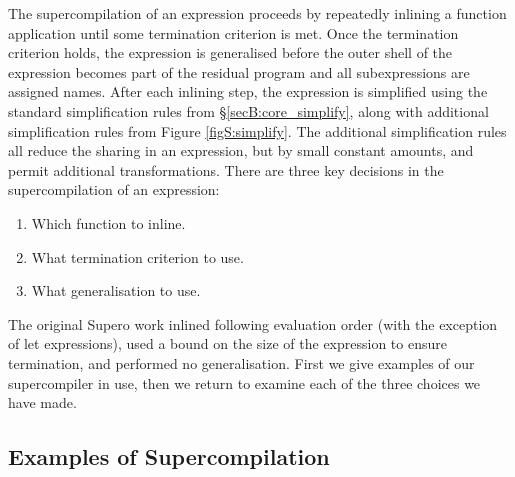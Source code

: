 The supercompilation of an expression proceeds by repeatedly inlining a function application until some termination criterion is met. Once the termination criterion holds, the expression is generalised before the outer shell of the expression becomes part of the residual program and all subexpressions are assigned names. After each inlining step, the expression is simplified using the standard simplification rules from \S\ref{secB:core_simplify}, along with additional simplification rules from Figure \ref{figS:simplify}. The additional simplification rules all reduce the sharing in an expression, but by small constant amounts, and permit additional transformations. There are three key decisions in the supercompilation of an expression:

\begin{enumerate}
\item Which function to inline.
\item What termination criterion to use.
\item What generalisation to use.
\end{enumerate}

The original Supero work \cite{me:supero_ifl} inlined following evaluation order (with the exception of let expressions), used a bound on the size of the expression to ensure termination, and performed no generalisation. First we give examples of our supercompiler in use, then we return to examine each of the three choices we have made.

\subsection{Examples of Supercompilation}

